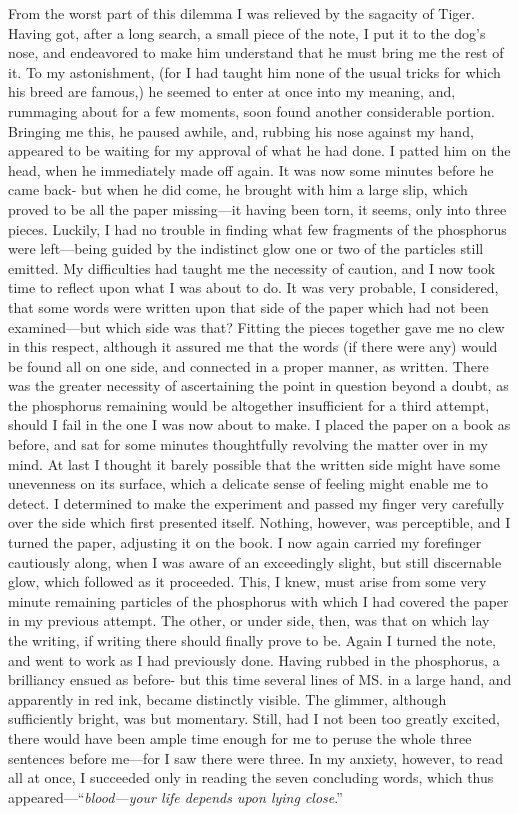 From the worst part of this dilemma I was relieved by the sagacity of Tiger.
Having got, after a long search, a small piece of the note, I put it to the
dog's nose, and endeavored to make him understand that he must bring me the rest
of it. To my astonishment, (for I had taught him none of the usual tricks for
which his breed are famous,) he seemed to enter at once into my meaning, and,
rummaging about for a few moments, soon found another considerable portion.
Bringing me this, he paused awhile, and, rubbing his nose against my hand,
appeared to be waiting for my approval of what he had done. I patted him on the
head, when he immediately made off again. It was now some minutes before he came
back- but when he did come, he brought with him a large slip, which proved to be
all the paper missing---it having been torn, it seems, only into three pieces.
Luckily, I had no trouble in finding what few fragments of the phosphorus were
left---being guided by the indistinct glow one or two of the particles still
emitted. My difficulties had taught me the necessity of caution, and I now took
time to reflect upon what I was about to do. It was very probable, I considered,
that some words were written upon that side of the paper which had not been
examined---but which side was that? Fitting the pieces together gave me no clew
in this respect, although it assured me that the words (if there were any) would
be found all on one side, and connected in a proper manner, as written. There
was the greater necessity of ascertaining the point in question beyond a doubt,
as the phosphorus remaining would be altogether insufficient for a third
attempt, should I fail in the one I was now about to make. I placed the paper on
a book as before, and sat for some minutes thoughtfully revolving the matter
over in my mind. At last I thought it barely possible that the written side
might have some unevenness on its surface, which a delicate sense of feeling
might enable me to detect. I determined to make the experiment and passed my
finger very carefully over the side which first presented itself. Nothing,
however, was perceptible, and I turned the paper, adjusting it on the book. I
now again carried my forefinger cautiously along, when I was aware of an
exceedingly slight, but still discernable glow, which followed as it proceeded.
This, I knew, must arise from some very minute remaining particles of the
phosphorus with which I had covered the paper in my previous attempt. The other,
or under side, then, was that on which lay the writing, if writing there should
finally prove to be. Again I turned the note, and went to work as I had
previously done. Having rubbed in the phosphorus, a brilliancy ensued as before-
but this time several lines of MS. in a large hand, and apparently in red ink,
became distinctly visible. The glimmer, although sufficiently bright, was but
momentary. Still, had I not been too greatly excited, there would have been
ample time enough for me to peruse the whole three sentences before me---for I
saw there were three. In my anxiety, however, to read all at once, I succeeded
only in reading the seven concluding words, which thus
appeared---``\emph{blood---your life depends upon lying close}.'' 


